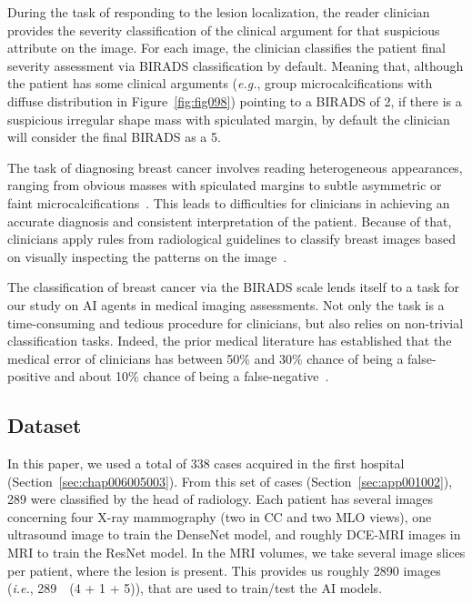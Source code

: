 During the task of responding to the lesion localization, the reader clinician provides the severity classification of the clinical argument for that suspicious attribute on the image.
For each image, the clinician classifies the patient final severity assessment via BIRADS classification by default.
Meaning that, although the patient has some clinical arguments ({\it e.g.}, group microcalcifications with diffuse distribution in Figure~\ref{fig:fig098}) pointing to a BIRADS of 2, if there is a suspicious irregular shape mass with spiculated margin, by default the clinician will consider the final BIRADS as a 5.

The task of diagnosing breast cancer involves reading heterogeneous appearances, ranging from obvious masses with spiculated margins to subtle asymmetric or faint microcalcifications~\cite{Sturesdotter2020}.
This leads to difficulties for clinicians in achieving an accurate diagnosis and consistent interpretation of the patient.
Because of that, clinicians apply rules from radiological guidelines to classify breast images based on visually inspecting the patterns on the image~\cite{doi:10.1148/radiol.2020192534}.

The classification of breast cancer via the BIRADS scale lends itself to a task for our study on AI agents in medical imaging assessments.
Not only the task is a time-consuming and tedious procedure for clinicians, but also relies on non-trivial classification tasks.
Indeed, the prior medical literature has established that the medical error of clinicians has between 50\% and 30\% chance of being a false-positive and about 10\% chance of being a false-negative~\cite{10.1093/jbi/wbaa118}.

\subsection{Dataset}
\label{sec:chap006005002}

In this paper, we used a total of 338 cases acquired in the first hospital (Section~\ref{sec:chap006005003}).
From this set of cases (Section~\ref{sec:app001002}), 289 were classified by the head of radiology.
Each patient has several images concerning four X-ray mammography (two in CC and two MLO views), one ultrasound image to train the DenseNet model, and roughly DCE-MRI images in MRI to train the ResNet model.
In the MRI volumes, we take several image slices per patient, where the lesion is present.
This provides us roughly 2890 images ({\it i.e.}, 289~\texttimes~(4 + 1 + 5)), that are used to train/test the AI models.

